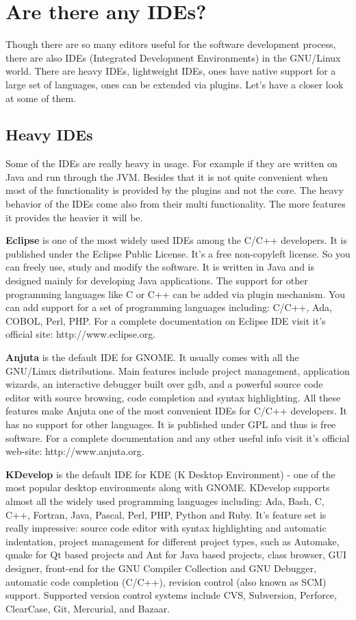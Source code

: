 
\section{Are there any IDEs?}
\label{ide}
Though there are so many editors useful for the software development process, there are also IDEs (Integrated Development Environments) in the GNU/Linux world. There are heavy IDEs, lightweight IDEs, ones have native support for a large set of languages, ones can be extended via plugins. Let's have a closer look at some of them.

\subsection{Heavy IDEs}
Some of the IDEs are really heavy in usage. For example if they are written on Java and run through the JVM. Besides that it is not quite convenient when most of the functionality is provided by the plugins and not the core. The heavy behavior of the IDEs come also from their multi functionality. The more features it provides the heavier it will be.

\textbf {Eclipse} is one of the most widely used IDEs among the C/C++ developers. It is published under the Eclipse Public License. It's a free non-copyleft license. So you can freely use, study and modify the software. It is written in Java and is designed mainly for developing Java applications. The support for other programming languages like C or C++ can be added via plugin mechanism. You can add support for a set of programming languages including: C/C++, Ada, COBOL, Perl, PHP. For a complete documentation on Eclipse IDE visit it's official site: http://www.eclipse.org.

\textbf {Anjuta} is the default IDE for GNOME. It usually comes with all the GNU/Linux distributions. Main features include project management, application wizards, an interactive debugger built over gdb, and a powerful source code editor with source browsing, code completion and syntax highlighting. All these features make Anjuta one of the most convenient IDEs for C/C++ developers. It has no support for other languages. It is published under GPL and thus is free software. For a complete documentation and any other useful info visit it's official web-site: http://www.anjuta.org. 

\textbf {KDevelop} is the default IDE for KDE (K Desktop Environment) - one of the most popular desktop environments along with GNOME. KDevelop supports almost all the widely used programming languages including: Ada, Bash, C, C++, Fortran, Java, Pascal, Perl, PHP, Python and Ruby. It's feature set is really impressive: source code editor with syntax highlighting and automatic indentation, project management for different project types, such as Automake, qmake for Qt based projects and Ant for Java based projects, class browser, GUI designer, front-end for the GNU Compiler Collection and GNU Debugger, automatic code completion (C/C++), revision control (also known as SCM) support. Supported version control systems include CVS, Subversion, Perforce, ClearCase, Git, Mercurial, and Bazaar.

